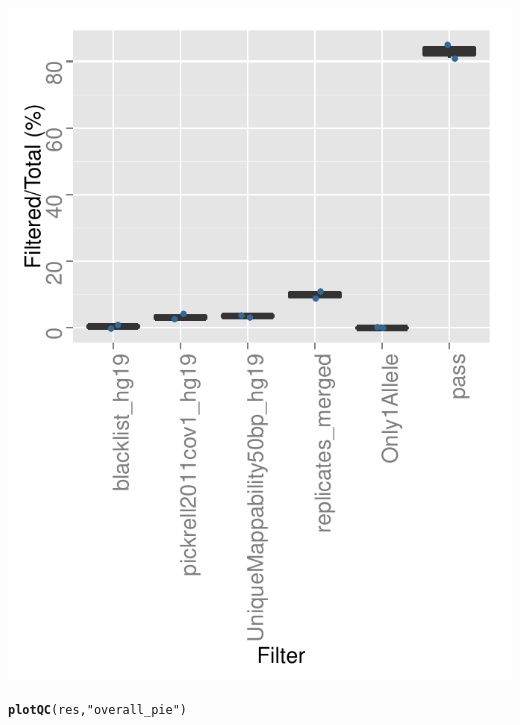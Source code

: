 \documentclass{article}\usepackage[]{graphicx}\usepackage[usenames,dvipsnames]{color}
\makeatletter
\def\maxwidth{ %
  \ifdim\Gin@nat@width>\linewidth
    \linewidth
  \else
    \Gin@nat@width
  \fi
}
\newcommand{\hlstr}[1]{\textcolor[rgb]{0.192,0.494,0.8}{#1}}%
\newcommand{\hlstd}[1]{\textcolor[rgb]{0.345,0.345,0.345}{#1}}%
\newcommand{\hlkwd}[1]{\textcolor[rgb]{0.737,0.353,0.396}{\textbf{#1}}}%
\newenvironment{kframe}{%
 \def\at@end@of@kframe{}%
 \ifinner\ifhmode%
  \def\at@end@of@kframe{\end{minipage}}%
  \begin{minipage}{\columnwidth}%
 \fi\fi%
 \def\FrameCommand##1{\hskip\@totalleftmargin \hskip-\fboxsep
 \colorbox{shadecolor}{##1}\hskip-\fboxsep
     \hskip-\linewidth \hskip-\@totalleftmargin \hskip\columnwidth}%
 \MakeFramed {\advance\hsize-\width
   \@totalleftmargin\z@ \linewidth\hsize
   \@setminipage}}%
 {\par\unskip\endMakeFramed%
 \at@end@of@kframe}
\newenvironment{knitrout}{}{} %
\makeatother
\begin{document}
\begin{knitrout}
{\centering \includegraphics[width=\maxwidth]{figure/QCplots-2} 

}


\begin{kframe}\begin{alltt}
\hlkwd{plotQC}\hlstd{(res,} \hlstr{"overall_pie"}\hlstd{)}
\end{alltt}
\end{kframe}


\end{knitrout}
\end{document}
